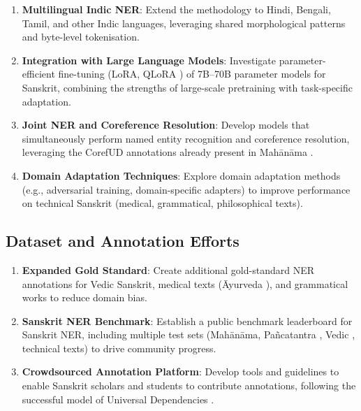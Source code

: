 \begin{enumerate}
    \item \textbf{Multilingual Indic NER}: Extend the methodology to Hindi, Bengali, Tamil, and other Indic languages, leveraging shared morphological patterns and byte-level tokenisation.

    \item \textbf{Integration with Large Language Models}: Investigate parameter-efficient fine-tuning (LoRA, QLoRA \cite{hu2022lora, dettmers2023qlora}) of 7B--70B parameter models for Sanskrit, combining the strengths of large-scale pretraining with task-specific adaptation.

    \item \textbf{Joint NER and Coreference Resolution}: Develop models that simultaneously perform named entity recognition and coreference resolution, leveraging the CorefUD annotations already present in Mah\={a}n\={a}ma \cite{sarkar2025mahanama}.

    \item \textbf{Domain Adaptation Techniques}: Explore domain adaptation methods (e.g., adversarial training, domain-specific adapters) to improve performance on technical Sanskrit (medical, grammatical, philosophical texts).
\end{enumerate}

\subsection{Dataset and Annotation Efforts}

\begin{enumerate}
    \item \textbf{Expanded Gold Standard}: Create additional gold-standard NER annotations for Vedic \cite{rigveda} Sanskrit, medical texts (Āyurveda \cite{ayurveda}), and grammatical works to reduce domain bias.

    \item \textbf{Sanskrit NER Benchmark}: Establish a public benchmark leaderboard for Sanskrit NER, including multiple test sets (Mahānāma, Pañcatantra \cite{pancatantra_text}, Vedic \cite{rigveda}, technical texts) to drive community progress.

    \item \textbf{Crowdsourced Annotation Platform}: Develop tools and guidelines to enable Sanskrit scholars and students to contribute annotations, following the successful model of Universal Dependencies \cite{nivre2016ud}.
\end{enumerate}

